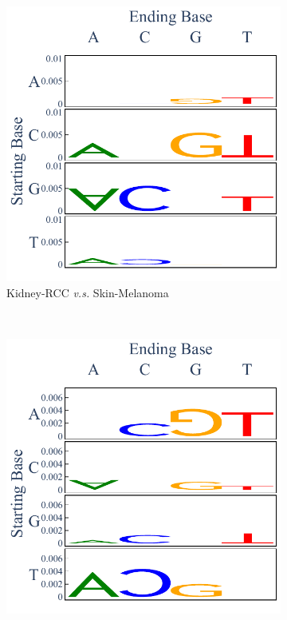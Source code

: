 \begin{figure}[htbp]
    \begin{subfigure}{.5\textwidth}
\includegraphics[scale=0.7]{graphics/spectra_Kidney-RCC_Skin-Melanoma.pdf}
    \caption{Kidney-RCC \textit{v.s.} Skin-Melanoma}
    \label{fig:spectra_kidney_skin}
    \end{subfigure}
    ~
    \begin{subfigure}{.5\textwidth}
    \includegraphics[scale=0.7]{graphics/spectra_Kidney-RCC_Liver-HCC.pdf}

\end{subfigure}
\end{figure}
